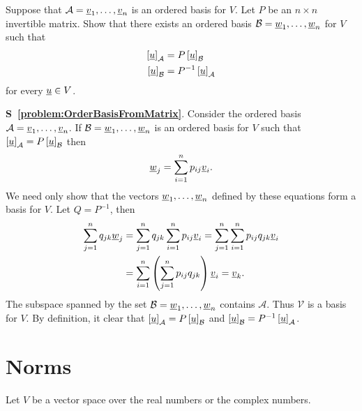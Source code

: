 \begin{problem} \label{problem:OrderBasisFromMatrix}
Suppose that $\mathcal{A} = \underline{v}_1, \ldots, \underline{v}_n$ is an ordered basis for $V$.
Let $P$ be an $n \times n$ invertible matrix.
Show that there exists an ordered basis $\mathcal{B} = \underline{w}_1, \ldots, \underline{w}_n$ for $V$ such that
\begin{align*}
\left[ \underline{u} \right]_{\mathcal{A}} &= P \left[ \underline{u} \right]_{\mathcal{B}} \\
\left[ \underline{u} \right]_{\mathcal{B}} &= P^{-1} \left[ \underline{u} \right]_{\mathcal{A}}
\end{align*}
for every $\underline{u} \in V$.
\end{problem}
\textbf{S~\ref{problem:OrderBasisFromMatrix}}.
Consider the ordered basis $\mathcal{A} = \underline{v}_1, \ldots, \underline{v}_n$.
If $\mathcal{B} = \underline{w}_1, \ldots, \underline{w}_n$ is an ordered basis for $V$ such that $\left[ \underline{u} \right]_{\mathcal{A}} = P \left[ \underline{u} \right]_{\mathcal{B}}$ then
\begin{equation*}
\underline{w}_j = \sum_{i = 1}^n p_{ij} \underline{v}_i.
\end{equation*}
We need only show that the vectors $\underline{w}_1, \ldots, \underline{w}_n$ defined by these equations form a basis for $V$.
Let $Q = P^{-1}$, then
\begin{equation*}
\begin{split}
\sum_{j = 1}^n q_{jk} \underline{w}_j
&= \sum_{j = 1}^n q_{jk} \sum_{i = 1}^n p_{ij} \underline{v}_i
= \sum_{j = 1}^n \sum_{i = 1}^n p_{ij} q_{jk} \underline{v}_i \\
&= \sum_{i = 1}^n \left( \sum_{j = 1}^n p_{ij} q_{jk} \right) \underline{v}_i
= \underline{v}_k .
\end{split}
\end{equation*}
The subspace spanned by the set $\mathcal{B} = \underline{w}_1, \ldots, \underline{w}_n$ contains $\mathcal{A}$.
Thus $\mathcal{V}$ is a basis for $V$.
By definition, it clear that $\left[ \underline{u} \right]_{\mathcal{A}} = P \left[ \underline{u} \right]_{\mathcal{B}}$ and $\left[ \underline{u} \right]_{\mathcal{B}} = P^{-1} \left[ \underline{u} \right]_{\mathcal{A}}$.



\section{Norms}
Let $V$ be a vector space over the real numbers or the complex numbers.

